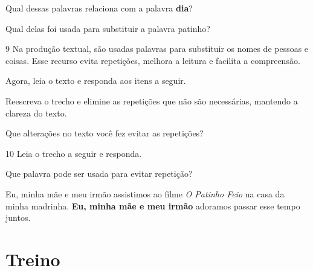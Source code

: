 \begin{conteudo}
\begin{conteudo}
\begin{conteudo}
\begin{conteudo}
\begin{conteudo}
\begin{escolha}
\item Qual dessas palavras relaciona com a palavra \textbf{dia}?

\item Qual delas foi usada para substituir a palavra patinho?
\end{escolha}

\num{9} Na produção textual, são usadas palavras para substituir 
os nomes de pessoas e coisas. Esse recurso evita repetições,
melhora a leitura e facilita a compreensão. 

Agora, leia o texto e responda aos itens a seguir.


\begin{escolha}
\item Reescreva o trecho e elimine as repetições que não são necessárias,
mantendo a clareza do texto.

\item Que alterações no texto você fez evitar as repetições?
\end{escolha}

\num{10} Leia o trecho a seguir e responda. 

Que palavra pode ser usada para evitar repetição?

\begin{myquote}
Eu, minha mãe e meu irmão assistimos ao filme \textit{O Patinho Feio} na
casa da minha madrinha. \textbf{Eu, minha mãe e meu irmão} adoramos passar
esse tempo juntos.
\end{myquote}


\section*{Treino}


\end{conteudo}
\end{conteudo}
\end{conteudo}
\end{conteudo}
\end{conteudo}
